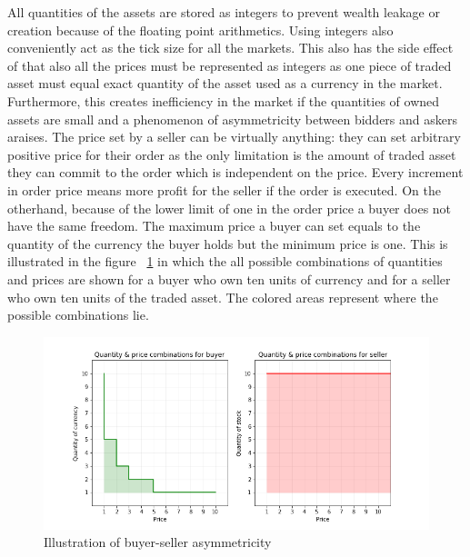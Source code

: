 All quantities of the assets are stored as integers to prevent wealth leakage
or creation because of the floating point arithmetics. Using integers also
conveniently act as the tick size for all the markets. This also has the side effect
of that also all the prices must be represented as integers as one piece
of traded asset must equal exact quantity of the asset used as a currency
in the market. Furthermore, this creates inefficiency in the market if the quantities
of owned assets are small and a phenomenon of asymmetricity between bidders and askers
araises. The price set by a seller can be virtually anything: they can set
arbitrary positive price for their order as the only limitation is the amount
of traded asset they can commit to the order which is independent on the price. 
Every increment in order price means more profit for the seller
if the order is executed. On the otherhand, because of the 
lower limit of one in the order price a buyer does not have the same freedom.
The maximum price a buyer can set equals to the quantity of the currency 
the buyer holds but the minimum price is one. This is
illustrated in the figure ~\ref{fig:buy_sell_asym} in which the all possible
combinations of quantities and prices are shown for a buyer who own ten units 
of currency and for a seller who own ten units of the traded asset. 
The colored areas represent where the possible combinations lie.


 \begin{figure}
    \includegraphics[width=\linewidth]{plots/buyer_seller_asymmetricity.png}
    \caption{Illustration of buyer-seller asymmetricity}
    \label{fig:buy_sell_asym}
\end{figure}

